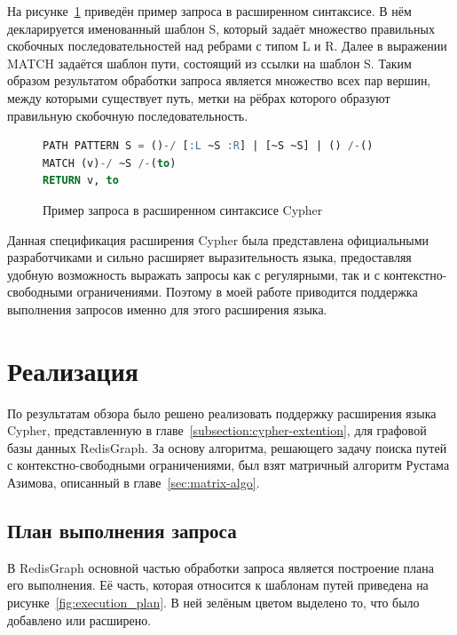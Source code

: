 На рисунке~\ref{code:cypher_query_3} приведён пример запроса в расширенном синтаксисе. В нём декларируется именованный шаблон S, который задаёт множество правильных скобочных последовательностей над ребрами с типом L и R. Далее в выражении MATCH задаётся шаблон пути, состоящий из ссылки на шаблон S. Таким образом результатом обработки запроса является множество всех пар вершин, между которыми существует путь, метки на рёбрах которого образуют правильную скобочную последовательность. 



\begin{figure}[h!]
\begin{lstlisting}[language=sql]
PATH PATTERN S = ()-/ [:L ~S :R] | [~S ~S] | () /-()
MATCH (v)-/ ~S /-(to)
RETURN v, to
\end{lstlisting}
\caption{Пример запроса в расширенном синтаксисе Cypher}
\label{code:cypher_query_3}
\end{figure}

Данная спецификация расширения Cypher была представлена официальными разработчиками и сильно расширяет выразительность языка, предоставляя удобную возможность выражать запросы как с регулярными, так и с контекстно-свободными ограничениями. Поэтому в моей работе приводится поддержка выполнения запросов именно для этого расширения языка.


\section{Реализация}
По результатам обзора было решено реализовать поддержку расширения языка Cypher, представленную в главе~\ref{subsection:cypher-extention}, для графовой базы данных RedisGraph. За основу алгоритма, решающего задачу поиска путей с контекстно-свободными ограничениями, был взят матричный алгоритм Рустама Азимова, описанный в главе~\ref{sec:matrix-algo}.


\subsection{План выполнения запроса}\label{execution-plan}
В RedisGraph основной частью обработки запроса является построение плана его выполнения. Её часть, которая относится к шаблонам путей приведена на рисунке~\ref{fig:execution_plan}. В ней зелёным цветом выделено то, что было добавлено или расширено.

